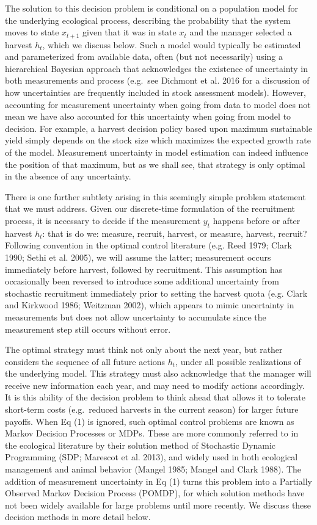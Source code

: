 \documentclass[3p]{elsarticle} %
\begin{document}
The solution to this decision problem is conditional on a population
model for the underlying ecological process, describing the probability
that the system moves to state \(x_{t+1}\) given that it was in state
\(x_t\) and the manager selected a harvest \(h_t\), which we discuss
below. Such a model would typically be estimated and parameterized from
available data, often (but not necessarily) using a hierarchical
Bayesian approach that acknowledges the existence of uncertainty in both
measurements and process (e.g.~see Dichmont et al. 2016 for a discussion
of how uncertainties are frequently included in stock assessment
models). However, accounting for measurement uncertainty when going from
data to model does not mean we have also accounted for this uncertainty
when going from model to decision. For example, a harvest decision
policy based upon maximum sustainable yield simply depends on the stock
size which maximizes the expected growth rate of the model. Measurement
uncertainty in model estimation can indeed influence the position of
that maximum, but as we shall see, that strategy is only optimal in the
absence of any uncertainty.

There is one further subtlety arising in this seemingly simple problem
statement that we must address. Given our discrete-time formulation of
the recruitment process, it is necessary to decide if the measurement
\(y_t\) happens before or after harvest \(h_t\): that is do we: measure,
recruit, harvest, or measure, harvest, recruit? Following convention in
the optimal control literature (e.g. Reed 1979; Clark 1990; Sethi et al.
2005), we will assume the latter; measurement occurs immediately before
harvest, followed by recruitment. This assumption has occasionally been
reversed to introduce some additional uncertainty from stochastic
recruitment immediately prior to setting the harvest quota (e.g. Clark
and Kirkwood 1986; Weitzman 2002), which appears to mimic uncertainty in
measurements but does not allow uncertainty to accumulate since the
measurement step still occurs without error.

The optimal strategy must think not only about the next year, but rather
considers the sequence of all future actions \({h_t}\), under all
possible realizations of the underlying model. This strategy must also
acknowledge that the manager will receive new information each year, and
may need to modify actions accordingly. It is this ability of the
decision problem to think ahead that allows it to tolerate short-term
costs (e.g.~reduced harvests in the current season) for larger future
payoffs. When Eq (1) is ignored, such optimal control problems are known
as Markov Decision Processes or MDPs. These are more commonly referred
to in the ecological literature by their solution method of Stochastic
Dynamic Programming (SDP; Marescot et al. 2013), and widely used in both
ecological management and animal behavior (Mangel 1985; Mangel and Clark
1988). The addition of measurement uncertainty in Eq (1) turns this
problem into a Partially Observed Markov Decision Process (POMDP), for
which solution methods have not been widely available for large problems
until more recently. We discuss these decision methods in more detail
below.
\end{document}
